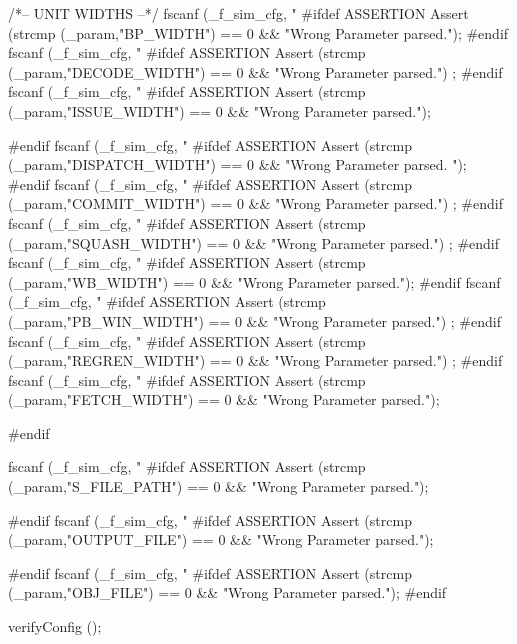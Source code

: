 \begin{DoxyCode}
{        /*-- UNIT WIDTHS --*/
        fscanf (_f_sim_cfg, "%
        #ifdef ASSERTION
        Assert (strcmp (_param,"BP_WIDTH") == 0 && "Wrong Parameter parsed.");
        #endif
        fscanf (_f_sim_cfg, "%
        #ifdef ASSERTION
        Assert (strcmp (_param,"DECODE_WIDTH") == 0 && "Wrong Parameter parsed.")
      ;
        #endif
        fscanf (_f_sim_cfg, "%
        #ifdef ASSERTION
        Assert (strcmp (_param,"ISSUE_WIDTH") == 0 && "Wrong Parameter parsed.");
      
        #endif
        fscanf (_f_sim_cfg, "%
        #ifdef ASSERTION
        Assert (strcmp (_param,"DISPATCH_WIDTH") == 0 && "Wrong Parameter parsed.
      ");
        #endif
        fscanf (_f_sim_cfg, "%
        #ifdef ASSERTION
        Assert (strcmp (_param,"COMMIT_WIDTH") == 0 && "Wrong Parameter parsed.")
      ;
        #endif
        fscanf (_f_sim_cfg, "%
        #ifdef ASSERTION
        Assert (strcmp (_param,"SQUASH_WIDTH") == 0 && "Wrong Parameter parsed.")
      ;
        #endif
        fscanf (_f_sim_cfg, "%
        #ifdef ASSERTION
        Assert (strcmp (_param,"WB_WIDTH") == 0 && "Wrong Parameter parsed.");
        #endif
        fscanf (_f_sim_cfg, "%
        #ifdef ASSERTION
        Assert (strcmp (_param,"PB_WIN_WIDTH") == 0 && "Wrong Parameter parsed.")
      ;
        #endif
        fscanf (_f_sim_cfg, "%
        #ifdef ASSERTION
        Assert (strcmp (_param,"REGREN_WIDTH") == 0 && "Wrong Parameter parsed.")
      ;
        #endif
        fscanf (_f_sim_cfg, "%
        #ifdef ASSERTION
        Assert (strcmp (_param,"FETCH_WIDTH") == 0 && "Wrong Parameter parsed.");
      
        #endif

        fscanf (_f_sim_cfg, "%
        #ifdef ASSERTION
        Assert (strcmp (_param,"S_FILE_PATH") == 0 && "Wrong Parameter parsed.");
      
        #endif
        fscanf (_f_sim_cfg, "%
        #ifdef ASSERTION
        Assert (strcmp (_param,"OUTPUT_FILE") == 0 && "Wrong Parameter parsed.");
      
        #endif
        fscanf (_f_sim_cfg, "%
        #ifdef ASSERTION
        Assert (strcmp (_param,"OBJ_FILE") == 0 && "Wrong Parameter parsed.");
        #endif

        verifyConfig ();
}
\end{DoxyCode}


